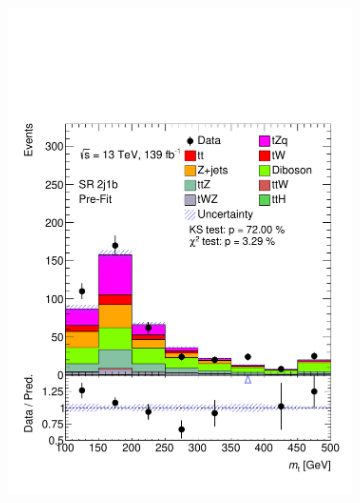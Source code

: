 \begin{figure}[!h]
\begin{subfigure}[b]{0.33\linewidth}
    \includegraphics[width=\linewidth]{ubonn-thesis/Chapters/Chapters_06/Figure/Input_distribution/SR_2j1b_Top_mass.pdf} 
  \end{subfigure} 
  \begin{subfigure}[b]{0.33\linewidth}
    \centering

\end{subfigure}
\end{figure}
